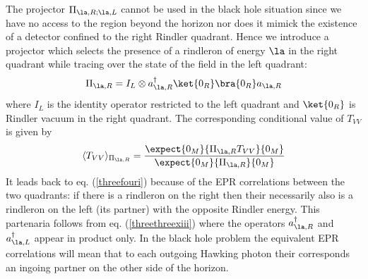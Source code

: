 \documentclass[12pt]{article}
\begin{document}
The projector $\Pi_{\la,R;\la,L}$
cannot be used in the black hole situation since we have no access to the
region beyond the horizon nor does it mimick the existence of a
detector confined to the right Rindler quadrant. Hence
we introduce a projector which selects the presence of a rindleron
of energy $\la$ in the right quadrant  while tracing over the state of the
field in the left quadrant:
\begin{equation}
\Pi_{\la,R} =  I_{L} \otimes
a^\dagger_{\la,R}  \ket{0_{R}}\bra{0_{R}} a_{\la,R}
 \label{threefourv} \end{equation}
where $I_{{L }}$ is the identity operator restricted to the left
quadrant and $\ket{0_{R }}$ is Rindler vacuum in the right
quadrant. The
corresponding conditional value of $T_{VV}$ is given by
\begin{equation}
\langle T_{VV} \rangle _{\Pi_{\la,R}}= {
\expect {0_M}{\Pi_{\la,R} T_{VV}}{0_M} \over  \expect {0_M}{\Pi_{\la,R}}{0_M} }
\label{threefourvi} \end{equation} It leads back
 to eq. (\ref{threefouri}) because of the EPR correlations between the two
quadrants: if there is a rindleron on the right then their
necessarily also is a rindleron on
the left (its partner) with the
opposite
 Rindler
energy. This partenaria follows from eq. (\ref{threethreexiii}) where
the operators
$a^\dagger_{\la,R}$ and $a^\dagger_{\la,L}$
appear
 in product only.
 In the
black hole problem
the equivalent
EPR correlations will mean that
 to each outgoing Hawking photon their
corresponds an ingoing partner on the other side of the horizon.
\end{document}
